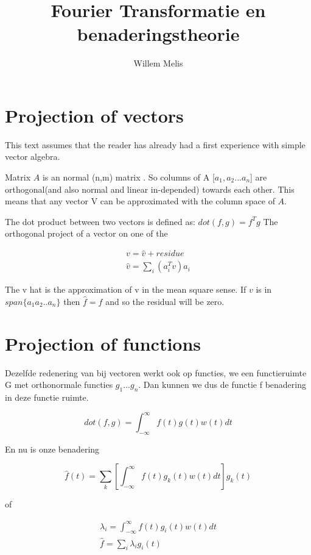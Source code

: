 \documentclass[11pt]{article} %
\title{Fourier Transformatie en benaderingstheorie}
\author{Willem Melis}
\begin{document}
\maketitle

\section{Projection of vectors}
This text assumes that the reader has already had a first experience with simple vector algebra. 

Matrix $A$ is an normal (n,m) matrix . So columns of A [$a_1,a_2 ... a_n$] are orthogonal(and also normal and linear in-depended) towards each other. This means that any vector V can be approximated with the column space of $A$.

The dot product between two vectors is defined  as: $dot(f,g) = f^Tg$ The orthogonal project of a vector on one of the 

\begin{eqnarray}
v =  \hat{v} + residue\\
\hat{v} = \sum_i (a_i^Tv)a_i
\end{eqnarray}
	
The v hat is the approximation of v in the mean square sense. If  $v$ is in  $span\{a_1 a_2 .. a_n\}$ then $\hat{f} =f$ and so the residual will be zero.

\section{Projection of functions}

Dezelfde redenering van bij vectoren werkt ook op functies, we een functieruimte G met orthonormale functies $g_1 ... g_n$. Dan kunnen we dus de functie f benadering in deze functie ruimte.


\begin{equation}
	dot(f,g) =  \int_{-\infty}^{\infty} f(t) g(t) w(t) dt
\end{equation}

En nu is onze benadering

\begin{equation}
\hat{f}(t) =  \sum_k [\int_{-\infty}^{\infty} f(t) g_k(t) w(t) dt]g_k(t)
\end{equation}

of

\begin{eqnarray}
\lambda_i =   \int_{-\infty}^{\infty} f(t) g_i(t) w(t)dt \\
\hat{f} = \sum_i \lambda_i g_i(t)
\end{eqnarray}
\end{document}
